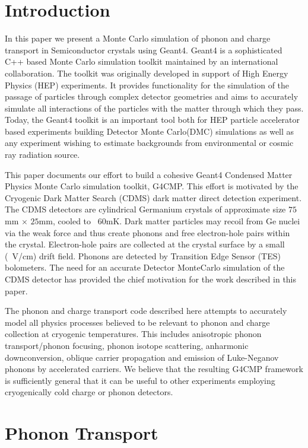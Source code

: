 \documentclass[preprint,12pt]{elsarticle}
\begin{document}
\section{Introduction}
\label{sec:Introduction}

In this paper we present a Monte Carlo simulation of phonon and charge transport in Semiconductor crystals using Geant4. Geant4 is a sophisticated C++ based Monte Carlo simulation toolkit maintained by an international collaboration. The toolkit was originally developed in support of High Energy Physics (HEP) experiments. It provides functionality for the simulation of the passage of particles through complex detector geometries and aims to accurately simulate all interactions of the particles with the matter through which they pass. Today, the Geant4 toolkit is an important tool both for HEP particle accelerator based experiments building Detector Monte Carlo(DMC) simulations as well as any experiment wishing to estimate backgrounds from environmental or cosmic ray radiation source.

This paper documents our effort to build a cohesive Geant4 Condensed Matter Physics Monte Carlo simulation toolkit, G4CMP. This effort is motivated by the Cryogenic Dark Matter Search (CDMS) dark  matter direct detection experiment. The CDMS detectors are cylindrical Germanium crystals of approximate size $75$mm $\times$ $25$mm, cooled to ~$60$mK. Dark matter particles may recoil from Ge nuclei via the weak force and thus create phonons and free electron-hole pairs within the crystal. Electron-hole pairs are collected at the crystal surface by a small (~V/cm) drift field. Phonons are detected by Transition Edge Sensor (TES) bolometers. The need for an accurate Detector MonteCarlo simulation of the CDMS detector has provided the chief motivation for the work described in this paper.

The phonon and charge transport code described here attempts to accurately model all physics processes believed to be relevant to phonon and charge collection at cryogenic temperatures. This includes anisotropic phonon transport/phonon focusing, phonon isotope scattering, anharmonic downconversion, oblique carrier propagation and emission of Luke-Neganov phonons by accelerated carriers. We believe that the resulting G4CMP framework is sufficiently general that it can be useful to other experiments employing cryogenically cold charge or phonon detectors. 

\section{Phonon Transport}
\label{sec:PhononTransport}
\end{document}

